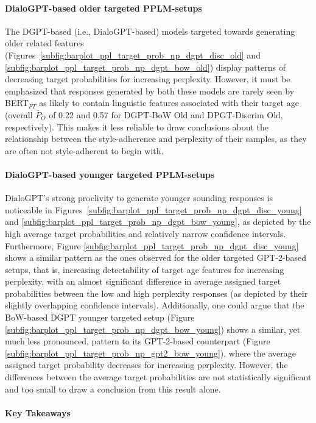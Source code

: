 \paragraph{DialoGPT-based older targeted PPLM-setups} The DGPT-based (i.e., DialoGPT-based) models targeted towards generating older related features (Figures~\ref{subfig:barplot_ppl_target_prob_np_dgpt_disc_old} and \ref{subfig:barplot_ppl_target_prob_np_dgpt_bow_old}) display patterns of decreasing target probabilities for increasing perplexity. However, it must be emphasized that responses generated by both these models are rarely seen by BERT$_{FT}$ as likely to contain linguistic features associated with their target age (overall $\bar{P}_O$ of 0.22 and 0.57 for DGPT-BoW Old and DPGT-Discrim Old, respectively). This makes it less reliable to draw conclusions about the relationship between the style-adherence and perplexity of their samples, as they are often not style-adherent to begin with.

\paragraph{DialoGPT-based younger targeted PPLM-setups} DialoGPT's strong proclivity to generate younger sounding responses is noticeable in Figures~\ref{subfig:barplot_ppl_target_prob_np_dgpt_disc_young} and \ref{subfig:barplot_ppl_target_prob_np_dgpt_bow_young}, as depicted by the high average target probabilities and relatively narrow confidence intervals. Furthermore, Figure \ref{subfig:barplot_ppl_target_prob_np_dgpt_disc_young} shows a similar pattern as the ones observed for the older targeted GPT-2-based setups, that is, increasing detectability of target age features for increasing perplexity, with an almost significant difference in average assigned target probabilities between the low and high perplexity responses (as depicted by their slightly overlapping confidence intervals). 
Additionally, one could argue that the BoW-based DGPT younger targeted setup (Figure \ref{subfig:barplot_ppl_target_prob_np_dgpt_bow_young}) shows a similar, yet much less pronounced, pattern to its GPT-2-based counterpart (Figure \ref{subfig:barplot_ppl_target_prob_np_gpt2_bow_young}), where the average assigned target probability decreases for increasing perplexity. However, the differences between the average target probabilities are not statistically significant and too small to draw a conclusion from this result alone.

\paragraph{Key Takeaways} 

